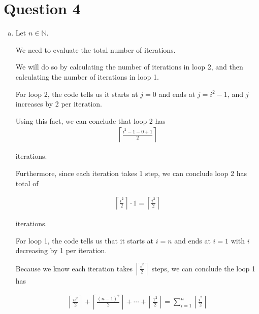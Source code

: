 \documentclass[12pt]{article}
\begin{document}
\section*{Question 4}
\begin{enumerate}[a.]
    \item

    Let $n \in \mathbb{N}$.

    \bigskip

    We need to evaluate the total number of iterations.

    \bigskip

    We will do so by calculating the number of iterations in loop 2, and then calculating
    the number of iterations in loop 1.

    \bigskip

    For loop 2, the code tells us it starts at $j = 0$ and ends at $j = i^2 - 1$,
    and $j$ increases by 2 per iteration.

    \bigskip

    Using this fact, we can conclude that loop 2 has
    \setcounter{equation}{0}
    \begin{align}
        \left\lceil \frac{i^2 - 1 - 0 + 1}{2} \right\rceil
    \end{align}

    iterations.

    \bigskip

    Furthermore, since each iteration takes 1 step, we can conclude loop 2 has total of

    \begin{align}
        \left\lceil \frac{i^2}{2} \right\rceil \cdot 1 =  \left\lceil \frac{i^2}{2} \right\rceil
    \end{align}

    iterations.

    \bigskip

    For loop 1, the code tells us that it starts at $i = n$ and ends at $i = 1$
    with $i$ decreasing by 1 per iteration.

    \bigskip

    Because we know each iteration takes $\left\lceil \frac{i^2}{2} \right\rceil$ steps,
    we can conclude the loop 1 has

    \begin{align}
        \left\lceil \frac{n^2}{2} \right\rceil + \left\lceil \frac{(n - 1)^2}{2} \right\rceil + \cdots
        + \left\lceil \frac{1^2}{2} \right\rceil = \sum\limits_{i=1}^{n} \left\lceil \frac{i^2}{2} \right\rceil
    \end{align}


\end{enumerate}
\end{document}
